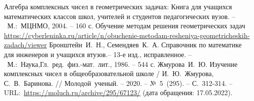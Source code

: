 \renewcommand\bibname{Список литературы}
\begin{thebibliography}{00}
     Алгебра комплексных чисел в геометрических задачах:
    Книга для учащихся математических классов школ, учителей и студентов педагогических вузов. --~М.:~МЦНМО,
    2004. -- 160 с.
     Обучение методам решения геометрических задач\\
    \href{https://cyberleninka.ru/article/n/obuchenie-metodam-resheniya-geometricheskih-zadach/viewer}{https://cyberleninka.ru/article/n/obuchenie-metodam-resheniya-geometricheskih-zadach/viewer}
     Бронштейн~И.~Н., Семендяев~К.~А. Справочник по математике для инженеров и учащихся втузов.-- 13-е изд., исправленное. --~М.:~Наука,Гл.~ред.~физ.-мат.~лит., 1986. -- 544 с.
     Жмурова~И.~Ю. Изучение комплексных чисел в общеобразовательной школе / И.~Ю.~Жмурова, С.~В.~Баринова. // Молодой~ученый. -- 2020. -- №~5~(295). -- С.~312-314. -- URL:~\href{https://moluch.ru/archive/295/67123/}{https://moluch.ru/archive/295/67123/} (дата обращения: 17.05.2022).
\end{thebibliography}
